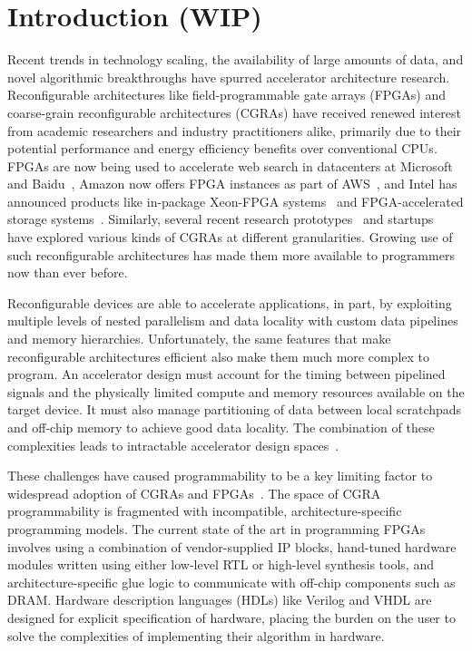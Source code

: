 \section{Introduction (WIP)}
\label{intro}

Recent trends in technology scaling, the availability of large amounts of data, and novel algorithmic breakthroughs
have spurred accelerator architecture research. Reconfigurable architectures like field-programmable gate arrays (FPGAs) and coarse-grain reconfigurable  architectures (CGRAs)
have received renewed interest from academic researchers and industry practitioners alike, primarily due to their potential performance and energy efficiency benefits over conventional CPUs. 
FPGAs are now being used to accelerate web search
in datacenters at Microsoft and Baidu~\cite{catapult, baidu},
Amazon now offers FPGA instances as part of AWS~\cite{awsf1}, 
and Intel has announced products like in-package Xeon-FPGA systems~\cite{harp}
and FPGA-accelerated storage systems~\cite{nand_flash}.
Similarly, several recent research prototypes~\cite{dyser, ti, scaledeep, scnn, plasticine}
and startups~\cite{wavecomp, nervana} have explored various
kinds of CGRAs at different granularities. 
Growing use of such reconfigurable architectures has made them more available to programmers now than ever before.


Reconfigurable devices are able to accelerate applications, in part, by exploiting multiple levels of nested parallelism and data locality with custom data pipelines and memory hierarchies.
Unfortunately, the same features that make reconfigurable architectures efficient also make them much more complex to program. An accelerator design must account for the timing between pipelined signals and
the physically limited compute and memory resources available on the target device. It must also manage partitioning of data between local scratchpads and off-chip memory to achieve good data locality. 
The combination of these complexities leads to intractable accelerator design spaces~\cite{cascaval}.


These challenges have caused programmability to be a key limiting factor to widespread adoption of CGRAs and FPGAs~\cite{fpgaMasses,DeSutter2013}. 
The space of CGRA programmability is fragmented with incompatible, architecture-specific programming models.
The current state of the art in programming FPGAs involves using a combination of vendor-supplied IP blocks, hand-tuned hardware modules written using either low-level RTL or high-level synthesis tools, and architecture-specific glue logic to communicate with off-chip components such as DRAM. 
Hardware description languages (HDLs) like Verilog and VHDL are designed for explicit specification of hardware, 
placing the burden on the user to solve the complexities of implementing their algorithm in hardware.


